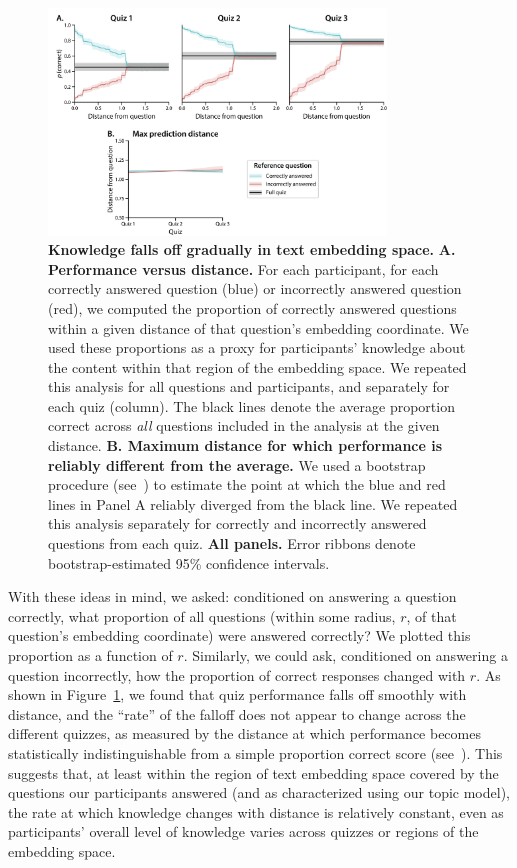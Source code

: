 \documentclass[10pt]{article}
\renewcommand{\nameref}[1]{\mbox{\textit{\oldnameref{#1}}}}
\begin{document}
\begin{figure}[t]
    \centering
    \includegraphics[width=0.8\textwidth]{figs/knowledge-smoothness}

    \caption{\textbf{Knowledge falls off gradually in text embedding space.}
    \textbf{A. Performance versus distance.} For each participant, for each
    correctly answered question (blue) or incorrectly answered question (red),
    we computed the proportion of correctly answered questions within a given
    distance of that question's embedding coordinate. We used these proportions
    as a proxy for participants' knowledge about the content within that region
    of the embedding space. We repeated this analysis for all questions and
    participants, and separately for each quiz (column). The black lines denote
    the average proportion correct across \textit{all} questions included in
    the analysis at the given distance. \textbf{B. Maximum distance for which
    performance is reliably different from the average.} We used a bootstrap
    procedure (see~\nameref{subsec:smoothness}) to estimate the point at which
    the blue and red lines in Panel A reliably diverged from the black line. We
    repeated this analysis separately for correctly and incorrectly answered
    questions from each quiz. \textbf{All panels.} Error ribbons denote
    bootstrap-estimated 95\% confidence intervals.}

    \label{fig:smoothness}
\end{figure}

With these ideas in mind, we asked: conditioned on answering a question
correctly, what proportion of all questions (within some radius, $r$, of that
question's embedding coordinate) were answered correctly? We plotted this
proportion as a function of $r$. Similarly, we could ask, conditioned on
answering a question incorrectly, how the proportion of correct responses
changed with $r$. As shown in Figure~\ref{fig:smoothness}, we found that quiz
performance falls off smoothly with distance, and the ``rate'' of the falloff
does not appear to change across the different quizzes, as measured by the
distance at which performance becomes statistically indistinguishable from a
simple proportion correct score (see~\nameref{subsec:smoothness}). This
suggests that, at least within the region of text embedding space covered by
the questions our participants answered (and as characterized using our topic
model), the rate at which knowledge changes with distance is relatively
constant, even as participants' overall level of knowledge varies across
quizzes or regions of the embedding space.
\end{document}
